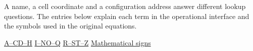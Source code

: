 A name, a cell coordinate and a configuration address answer different lookup questions. The entries below explain each term in the operational interface and the symbols used in the original equations.

\noindent\textsf{\hyperlink{g-a}{A--C}\quad\hyperlink{g-d}{D--H}\quad
\hyperlink{g-i}{I--N}\quad\hyperlink{g-o}{O--Q}\quad
\hyperlink{g-r}{R--S}\quad\hyperlink{g-t}{T--Z}\quad
\hyperlink{g-notation}{Mathematical signs}}

\newcommand{\sosdictgroup}[2]{\par\Needspace{5\baselineskip}\manualtarget{#1}\subsection*{#2}}

